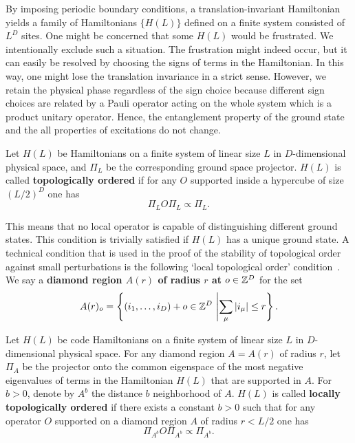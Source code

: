 By imposing periodic boundary conditions,
a translation-invariant Hamiltonian yields
a family of Hamiltonians $\{ H(L) \}$ defined on a finite system consisted of $L^D$ sites.
One might be concerned that some $H(L)$ would be frustrated.
We intentionally exclude such a situation.
The frustration might indeed occur, but it can easily be resolved
by choosing the signs of terms in the Hamiltonian.
In this way, one might lose the translation invariance in a strict sense.
However, we retain the physical phase regardless of the sign choice
because different sign choices are related by a Pauli operator acting on
the whole system which is a product unitary operator.
Hence, the entanglement property of the ground state 
and the all properties of excitations do not change.

\begin{defn}
Let $H(L)$ be Hamiltonians on a finite system of linear size $L$
in $D$-dimensional physical space,
and $\Pi_L$ be the corresponding ground space projector.
$H(L)$ is called {\bf topologically ordered} if
for any $O$ supported inside a hypercube of size $(L/2)^D$
one has
\begin{equation}
 \Pi_L O \Pi_L \propto \Pi_L .
\label{eq:tqo}
\end{equation}
\label{defn:tqo}
\end{defn}
This means that no local operator is capable of distinguishing different ground states.
This condition is trivially satisfied if $H(L)$ has a unique ground state.
A technical condition that is used in the proof of the stability of topological order
against small perturbations is the following `local topological order'
condition~\cite{MichalakisPytel2011stability,
BravyiHastingsMichalakis2010stability,
BravyiHastings2011short}.
We say a {\bf diamond region $A(r)$ of radius $r$ at $o \in \mathbb{Z}^D$} for the set
\[
 A(r)_o = \left\{ (i_1,\ldots,i_D) + o \in \mathbb{Z}^D ~\middle| \sum_\mu |i_\mu| \le r \right\} .
\]
\begin{defn}
Let $H(L)$ be code Hamiltonians on a finite system of linear size $L$
in $D$-dimensional physical space.
For any diamond region $A=A(r)$ of radius $r$,
let $\Pi_A$ be the projector onto the common eigenspace of the most negative eigenvalues of terms
in the Hamiltonian $H(L)$ that are supported in $A$.
For $b > 0$, denote by $A^b$ the distance $b$ neighborhood of $A$.
$H(L)$ is called {\bf locally topologically ordered} if
there exists a constant $b > 0$ such that
for any operator $O$ supported on a diamond region $A$ of radius $r < L/2$
one has
\begin{equation}
 \Pi_{A^b} O \Pi_{A^b} \propto \Pi_{A^b} .
\label{eq:local-tqo}
\end{equation}
\label{defn:local-tqo}
\end{defn}
